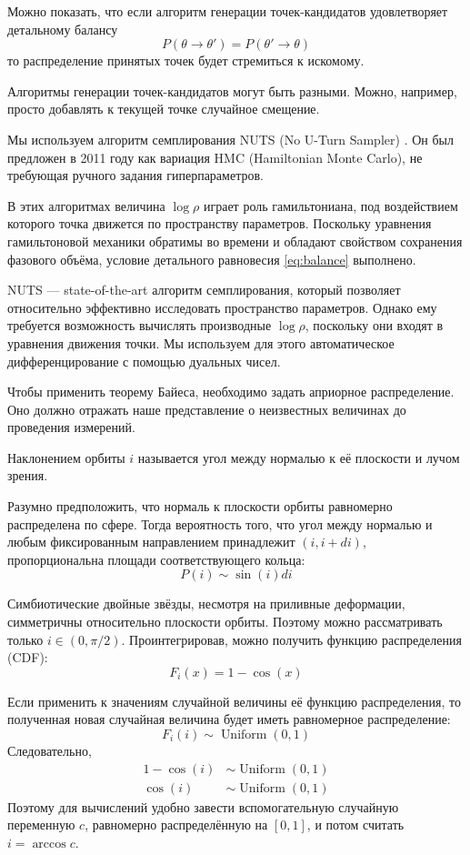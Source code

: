 Можно показать, что если алгоритм генерации точек-кандидатов удовлетворяет детальному балансу
\begin{equation}
P(\theta \to \theta') = P(\theta' \to \theta)
\label{eq:balance}
\end{equation}
то распределение принятых точек будет стремиться к искомому.

Алгоритмы генерации точек-кандидатов могут быть разными. Можно, например, просто добавлять к текущей точке случайное смещение.

Мы используем алгоритм семплирования NUTS (No U-Turn Sampler) \cite{NUTS}. Он был предложен в 2011 году как вариация HMC (Hamiltonian Monte Carlo), не требующая ручного задания гиперпараметров.

В этих алгоритмах величина $\log \rho$ играет роль гамильтониана, под воздействием которого точка движется по пространству параметров. Поскольку уравнения гамильтоновой механики обратимы во времени и обладают свойством сохранения фазового объёма, условие детального равновесия \eqref{eq:balance} выполнено.

NUTS --- state-of-the-art алгоритм семплирования, который позволяет относительно эффективно исследовать пространство параметров. Однако ему требуется возможность вычислять производные $\log \rho$, поскольку они входят в уравнения движения точки. Мы используем для этого автоматическое дифференцирование с помощью дуальных чисел.



Чтобы применить теорему Байеса, необходимо задать априорное распределение. Оно должно отражать наше представление о неизвестных величинах до проведения измерений.


Наклонением орбиты $i$ называется угол между нормалью к её плоскости и лучом зрения.

Разумно предположить, что нормаль к плоскости орбиты равномерно распределена по сфере. Тогда вероятность того, что угол между нормалью и любым фиксированным направлением принадлежит $(i, i + di)$, пропорциональна площади соответствующего кольца:
\[
P(i) \sim \sin(i) di
\]

Симбиотические двойные звёзды, несмотря на приливные деформации, симметричны относительно плоскости орбиты. Поэтому можно рассматривать только $i \in (0, \pi/2)$. Проинтегрировав, можно получить функцию распределения (CDF):
\[
F_i (x) = 1 - \cos(x)
\]

Если применить к значениям случайной величины её функцию распределения, то полученная новая случайная величина будет иметь равномерное распределение:
\[
F_i(i) \sim \operatorname{Uniform}(0, 1)
\]
Следовательно,
\[
\begin{aligned}
1 - \cos(i) &\sim \operatorname{Uniform}(0, 1) \\
\cos(i) &\sim \operatorname{Uniform}(0, 1)
\end{aligned}
\]
Поэтому для вычислений удобно завести вспомогательную случайную переменную $c$, равномерно распределённую на $[0, 1]$, и потом считать $i = \arccos c$.


